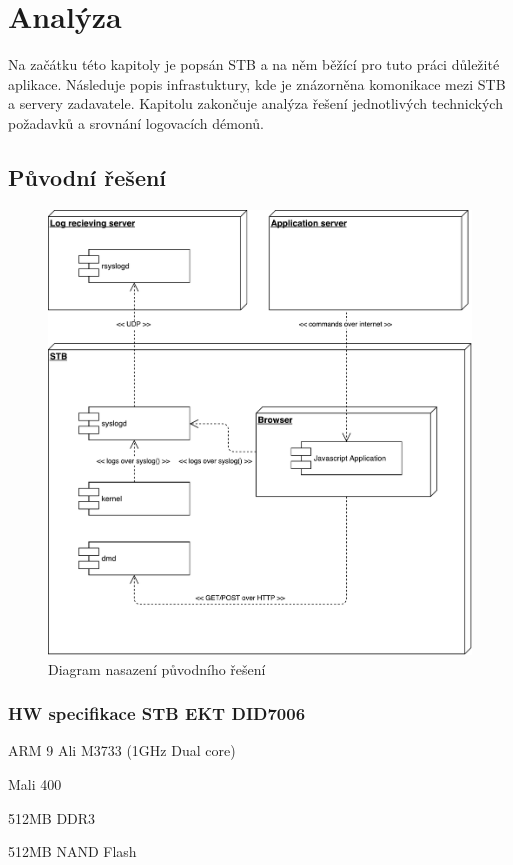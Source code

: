 \documentclass[thesis=B,czech]{FITthesis}[2012/06/26]
\begin{document}
\chapter{Analýza}
Na začátku této kapitoly je popsán STB a na něm běžící pro tuto práci důležité aplikace.
Následuje popis infrastuktury, kde je znázorněna komonikace mezi STB a servery zadavatele.
Kapitolu zakončuje analýza řešení jednotlivých technických požadavků a srovnání logovacích démonů.

\section{Původní řešení}
\begin{figure}[ht]
	\centering
	\includegraphics[scale=0.5]{images/diagram-nasazeni-puvodniho-reseni}
	\caption[Diagram nasazení původního řešení]{Diagram nasazení původního řešení}
\end{figure}

\subsection{HW specifikace STB EKT DID7006}
\begin{description}
\setlength\itemsep{-1ex}
  \item [CPU:] ARM 9 Ali M3733 (1GHz Dual core)
  \item [GPU:] Mali 400
  \item [RAM:] 512MB DDR3
  \item [Perzistentní paměť:] 512MB NAND Flash
\end{description}
\end{document}
